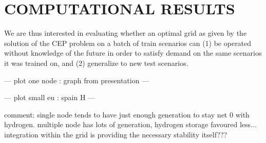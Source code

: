 \section{COMPUTATIONAL RESULTS}\label{section: comp res}
{
\color{purple}




We are thus interested in evaluating whether an optimal grid as given by the solution of the CEP problem on a batch of train scenarios can (1) be operated without knowledge of the future in order to satisfy demand on the same scenarios it was trained on, and (2) generalize to new test scenarios.

--- plot one node : graph from presentation ---

--- plot small eu : spain H ---

comment: single node tends to have just enough generation to stay net 0 with hydrogen. multiple node has lots of generation, hydrogen storage favoured less... integration within the grid is providing the necessary stability itself???

}
